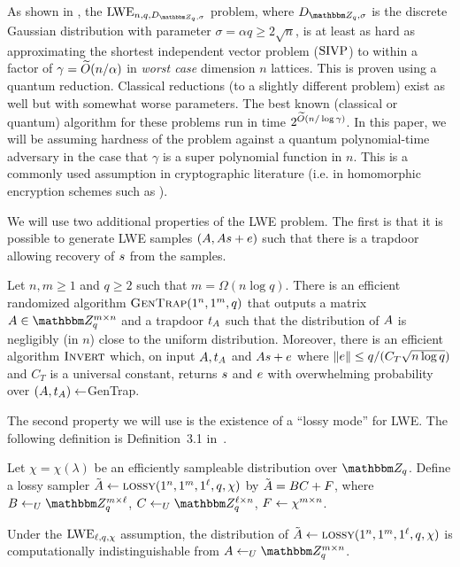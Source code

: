 As shown in \cite{regev2005,PRS17}, the $\lwe_{n,q,D_{\mZ_q,\sigma}}$ problem,  where $D_{\mZ_q,\sigma}$ is the discrete Gaussian distribution with parameter $\sigma = \alpha q \ge 2 \sqrt{n}$, is at least as hard as approximating the shortest independent vector problem ($\mathrm{SIVP}$) to within a factor of $\gamma = {\widetilde{O}}({n}/\alpha)$ in \emph{worst case} dimension $n$ lattices. This is proven using a quantum reduction. Classical reductions (to a slightly different problem) exist as well \cite{Peikert09,BLPRS13} but with somewhat worse parameters. The best known (classical or quantum) algorithm for these problems run in time $2^{{\widetilde{O}}(n/\log \gamma)}$. In this paper, we will be assuming hardness of the problem against a quantum polynomial-time adversary in the case that $\gamma$ is a super polynomial function in $n$. This is a commonly used assumption in cryptographic literature (i.e. in homomorphic encryption schemes such as \cite{fhelwe}).





We will use two additional properties of the LWE problem. The first is that it is possible to generate LWE samples $(\*A,\*A\*s+\*e)$ such that there is a trapdoor allowing recovery of $\*s$ from the samples. 

\begin{theorem}\label{thm:trapdoor}
Let $n,m\geq 1$ and $q\geq 2$ such that $m = \Omega(n\log q)$. There is an efficient randomized algorithm $\textsc{GenTrap}(1^n,1^m,q)$ that outputs a matrix $\*A \in \mZ_q^{m\times n}$ and a trapdoor $t_{\*A}$ such that the distribution of $\*A$ is negligibly (in $n$) close to the uniform distribution. Moreover, there is an efficient algorithm $\textsc{Invert}$ which, on input $\*A, t_{\*A}$ and $\*A\*s+\*e$ where $\|\*e\| \leq q/(C_T\sqrt{n\log q})$ and $C_T$ is a universal constant, returns $\*s$ and $\*e$ with overwhelming probability over $(\*A,t_{\*A})\leftarrow $GenTrap. \end{theorem}

The second property we will use is the existence of a ``lossy mode'' for LWE. The following definition is Definition~3.1 in~\cite{lwr}. 

\begin{definition}\label{def:lossy}
Let $\chi = \chi(\lambda)$ be an efficiently sampleable distribution over $\mZ_q$. Define a lossy sampler $\tilde{\*A} \leftarrow \lossy(1^n,1^m,1^\ell,q,\chi)$ by  $\tilde{\*A} = \*B\*C +\*F$, where $\*B\leftarrow_U \mZ_q^{m\times \ell}$, $\*C\leftarrow_U \mZ_q^{\ell \times n}$, $\*F\leftarrow \chi^{m\times n}$. 
\end{definition}

\begin{theorem}\label{thm:lossy}
Under the $\mathrm{LWE}_{\ell,q,\chi}$ assumption, the distribution of $\tilde{\*A} \leftarrow \lossy(1^n,1^m,1^\ell,q,\chi)$ is computationally indistinguishable from $\*A\leftarrow_U \mZ_q^{m\times n}$. 
\end{theorem}

